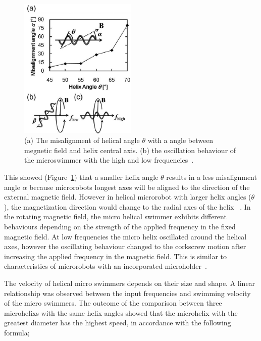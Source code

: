 \documentclass[12pt,a4paper,titlepage]{report}
\begin{document}
\begin{figure}
  \begin{center}
    \includegraphics[width=0.5\textwidth]{7}
  \caption[Effect of frequency on microswimmer\rq{}s behaviour]{(a) The misalignment of helical angle $\theta$ with a angle
between megnetic field and helix central axis. (b) the oscillation behaviour
of the microswimmer with the high and low frequencies~\citep{tottori2012magnetic}.}
  \label{ref7}
\end{center}
\end{figure}


This showed (Figure~\ref{ref7}) that a smaller helix angle $\theta$ results in a less misalignment 
angle $\alpha$ because microrobots longest axes will be aligned to the direction of the external magnetic field. 
However in helical microrobot with larger helix angles ($\theta$), the magnetization direction would change to 
the radial axes of the helix  ~\citep{tottori2012magnetic}.
In the rotating magnetic field, the micro helical swimmer exhibits different behaviours depending on 
the strength of the applied frequency in the fixed magnetic field. At low frequencies the micro helix oscillated 
around the helical axes, however the oscillating behaviour changed to the 
corkscrew motion after increasing the applied frequency in the magnetic field. This is similar to characteristics of 
microrobots with an incorporated
 microholder~\citep{tottori2012magnetic}.

The velocity of helical micro swimmers depends on their size and shape. A linear relationship was 
observed between the input frequencies and swimming velocity of the micro swimmers. The outcome of 
the comparison between three microhelixs with the same helix angles showed that the microhelix with the
 greatest diameter has the highest speed, in accordance with the following formula;
\end{document}
